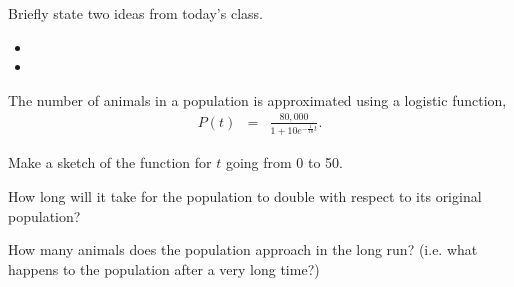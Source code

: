 \begin{problem}
\item Briefly state two ideas from today's class.
  \begin{itemize}
  \item
  \item
  \end{itemize}
\item The number of animals in a population is approximated using a
  logistic function,
  \begin{eqnarray*}
    P(t) & = & \frac{80,000}{1+10e^{-\frac{1}{10}t}}.
  \end{eqnarray*}
  \begin{subproblem}
  \item Make a sketch of the function for $t$ going from 0 to 50.
  \item How long will it take for the population to double with
    respect to its original population?
  \item How many animals does the population approach in the long run?
    (i.e. what happens to the population after a very long time?)
  \end{subproblem}
\end{problem}


